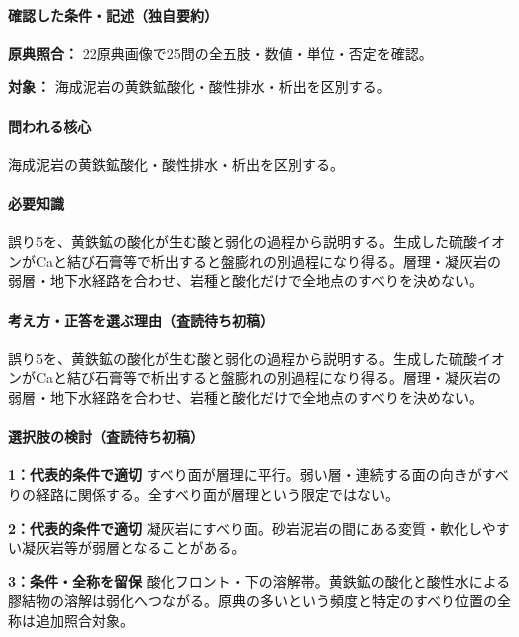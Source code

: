 \paragraph{確認した条件・記述（独自要約）}\mbox{}\par

\noindent\textbf{原典照合：} 22原典画像で25問の全五肢・数値・単位・否定を確認。\par

\noindent\textbf{対象：} 海成泥岩の黄鉄鉱酸化・酸性排水・析出を区別する。\par

\paragraph{問われる核心} 海成泥岩の黄鉄鉱酸化・酸性排水・析出を区別する。

\paragraph{必要知識} 誤り5を、黄鉄鉱の酸化が生む酸と弱化の過程から説明する。生成した硫酸イオンがCaと結び石膏等で析出すると盤膨れの別過程になり得る。層理・凝灰岩の弱層・地下水経路を合わせ、岩種と酸化だけで全地点のすべりを決めない。

\paragraph{考え方・正答を選ぶ理由（査読待ち初稿）} 誤り5を、黄鉄鉱の酸化が生む酸と弱化の過程から説明する。生成した硫酸イオンがCaと結び石膏等で析出すると盤膨れの別過程になり得る。層理・凝灰岩の弱層・地下水経路を合わせ、岩種と酸化だけで全地点のすべりを決めない。

\paragraph{選択肢の検討（査読待ち初稿）}\mbox{}\par

\noindent\textbf{1：代表的条件で適切} すべり面が層理に平行。弱い層・連続する面の向きがすべりの経路に関係する。全すべり面が層理という限定ではない。\par

\noindent\textbf{2：代表的条件で適切} 凝灰岩にすべり面。砂岩泥岩の間にある変質・軟化しやすい凝灰岩等が弱層となることがある。\par

\noindent\textbf{3：条件・全称を留保} 酸化フロント・下の溶解帯。黄鉄鉱の酸化と酸性水による膠結物の溶解は弱化へつながる。原典の多いという頻度と特定のすべり位置の全称は追加照合対象。\par

